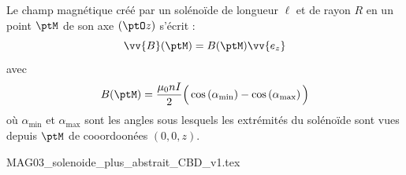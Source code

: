
\finEntrainement






\hauteurLargeurCadreReponse		{8mm}{5cm}
\initialisationEntrainement

\debutEntrainement
                                \initialisationPartieGauche %

Le champ magnétique créé par un solénoïde de longueur $\ell$ et de rayon $R$ en un point $\ptM$ de son axe $(\ptO z)$ s'écrit :
\[
\vv{B}(\ptM)=B(\ptM)\vv{e_z}
\]
avec 
\[
B(\ptM)=\dfrac{\mu_0 n I}{2} \Big( \cos\left(\alpha_{\text{min}}\right)-\cos\left(\alpha_{\text{max}}\right) \Big)
\]
où $\alpha_{\text{min}}$ et $\alpha_{\text{max}}$ sont les angles sous lesquels les extrémités du solénoïde sont vues depuis $\ptM$ de cooordoonées $(0, 0, z)$.

                                \initialisationPartieDroite %
% 
\begin{center}
{MAG03_solenoide_plus_abstrait_CBD_v1.tex}
\end{center}                                                          
%
% 
                               \finalisationDuPartageDePage %

